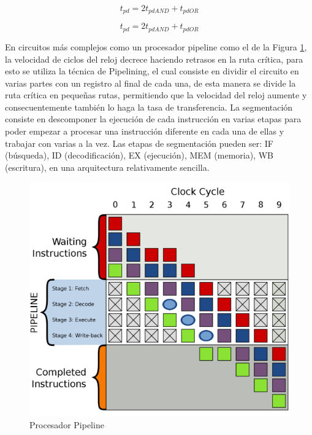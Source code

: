 \documentclass[journal]{IEEEtran}
\begin{document}
	\begin{equation}
		t_{pd} = 2t_{pdAND} + t_{pdOR}
		\label{eq:tpd}
	\end{equation}

	\begin{equation}
		t_{pd} = 2t_{pdAND} + t_{pdOR}
		\label{eq:tcd}
	\end{equation}

	En circuitos más complejos como un procesador pipeline como el de la Figura \ref{fig:pipe}, la velocidad de ciclos del reloj decrece haciendo retrasos en la ruta crítica, para esto se utiliza la técnica de Pipelining, el cual consiste en dividir el circuito en varias partes con un registro al final de cada una, de esta manera se divide la ruta crítica en pequeñas rutas, permitiendo que la velocidad del reloj aumente y consecuentemente también lo haga la tasa de transferencia. La segmentación consiste en descomponer la ejecución de cada instrucción en varias etapas para poder empezar a procesar una instrucción diferente en cada una de ellas y trabajar con varias a la vez. Las etapas de segmentación pueden ser: IF (búsqueda), ID (decodificación), EX (ejecución), MEM (memoria), WB (escritura), en una arquitectura relativamente sencilla.
	
	\begin{figure}[hbtp]
		\centering
		\includegraphics[scale = 0.15]{img/Pipe.jpg}
		\caption{Procesador Pipeline \cite{pipewiki}}
		\label{fig:pipe}
	\end{figure}
\end{document}
